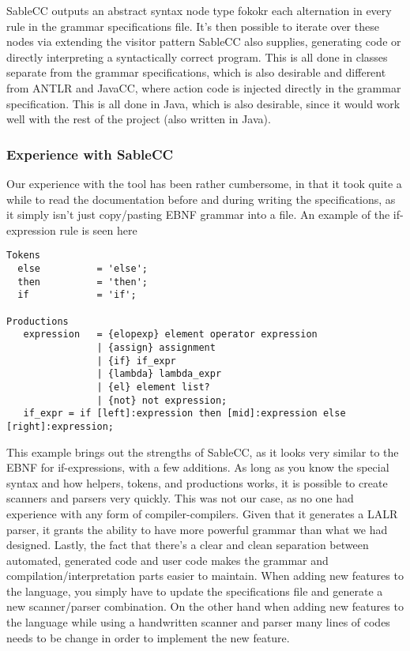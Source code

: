SableCC outputs an abstract syntax node type fokokr each alternation in
every rule in the grammar specifications file. It's then possible to
iterate over these nodes via extending the visitor pattern SableCC also
supplies, generating code or directly interpreting a syntactically
correct program. This is all done in classes separate from the grammar
specifications, which is also desirable and different from ANTLR
and JavaCC, where action code is injected directly in the grammar
specification. This is all done in Java, which is also desirable, since
it would work well with the rest of the project (also written in Java).

\subsubsection{Experience with SableCC}
Our experience with the tool has been rather cumbersome, in that it took
quite a while to read the documentation before and during writing the
specifications, as it simply isn't just copy/pasting EBNF grammar
into a file. An example of the if-expression rule is seen here

\begin{lstlisting}[caption=Part of the grammar specifications file of SableCC with focus on if-expressions.]
Tokens
  else          = 'else';
  then          = 'then';
  if            = 'if';

Productions
   expression   = {elopexp} element operator expression
                | {assign} assignment
                | {if} if_expr
                | {lambda} lambda_expr
                | {el} element list?
                | {not} not expression;
   if_expr = if [left]:expression then [mid]:expression else [right]:expression;
\end{lstlisting}

This example brings out the strengths of SableCC, as it looks very
similar to the EBNF for if-expressions, with a few additions. As long as
you know the special syntax and how helpers, tokens, and productions works, it
is possible to create scanners and parsers very quickly. This was not
our case, as no one had experience with any form of compiler-compilers.
Given that it generates a LALR parser, it grants the ability to have
more powerful grammar than what we had designed. Lastly, the fact that
there's a clear and clean separation between automated, generated code
and user code makes the grammar and compilation/interpretation parts
easier to maintain. When adding new features to the language, you simply
have to update the specifications file and generate a new scanner/parser
combination. On the other hand when adding new features to the language while
using a handwritten scanner and parser many lines of codes needs to be change
in order to implement the new feature. 


